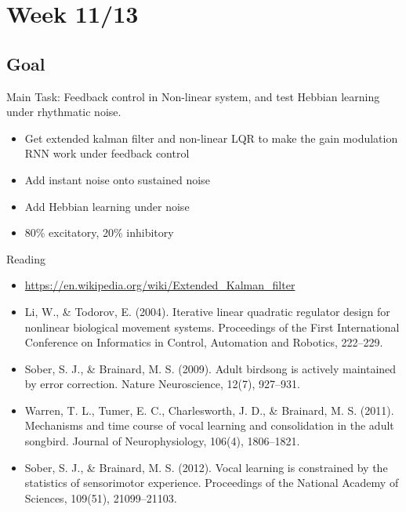 \documentclass[12pt, a4paper]{article}
\begin{document}
\newpage


\section*{Week 11/13}

\subsection*{Goal}

\noindent
Main Task: Feedback control in Non-linear system, and test Hebbian learning under rhythmatic noise.

\begin{itemize}
    \item Get extended kalman filter and non-linear LQR to make the gain modulation RNN work under feedback control
    \item Add instant noise onto sustained noise
    \item Add Hebbian learning under noise
    \item 80\% excitatory, 20\% inhibitory
\end{itemize}

\noindent
Reading

\begin{itemize}
    \item \url{https://en.wikipedia.org/wiki/Extended_Kalman_filter}
    \item Li, W., \& Todorov, E. (2004). Iterative linear quadratic regulator design for nonlinear biological movement systems. Proceedings of the First International Conference on Informatics in Control, Automation and Robotics, 222–229.
    \item Sober, S. J., \& Brainard, M. S. (2009). Adult birdsong is actively maintained by error correction. Nature Neuroscience, 12(7), 927–931.
    \item Warren, T. L., Tumer, E. C., Charlesworth, J. D., \& Brainard, M. S. (2011). Mechanisms and time course of vocal learning and consolidation in the adult songbird. Journal of Neurophysiology, 106(4), 1806–1821.
    \item Sober, S. J., \& Brainard, M. S. (2012). Vocal learning is constrained by the statistics of sensorimotor experience. Proceedings of the National Academy of Sciences, 109(51), 21099–21103.
\end{itemize}

\newpage
\end{document}
